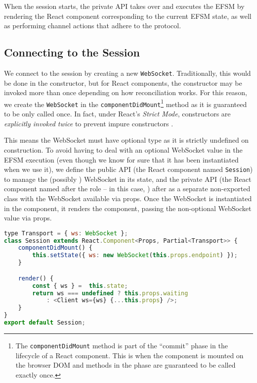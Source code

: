 When the session starts, the private API takes over and executes
the EFSM by rendering the React component corresponding to the
current EFSM state, as well as performing channel actions
that adhere to the protocol.

\subsection{Connecting to the Session}
We connect to the session by creating a new \texttt{WebSocket}.
Traditionally, this would be done in the constructor,
but for React components, the constructor may be invoked more
than once depending on how reconciliation works.
For this reason, we create the \texttt{WebSocket} in the
\texttt{componentDidMount}\footnote{
The \texttt{componentDidMount} method is part
of the ``commit'' phase in the lifecycle of a React component.
This is when the component is mounted on the browser DOM and
methods in the phase are guaranteed to be called exactly once.
} method as it is guaranteed
to be only called once.
In fact, under React's \textit{Strict Mode},
constructors are \textit{explicitly invoked twice} to 
prevent impure constructors \cite{ReactStrictMode}. 

This means the WebSocket must have optional type as it is 
strictly undefined on construction.
To avoid having to deal with an optional WebSocket value
in the EFSM execution (even though we know for sure that it
has been instantiated when we use it),
we define the public API (the React component named 
\texttt{Session}) to manage the (possibly )
WebSocket in its state, and the private API (the React component
named after the role -- in this case, ) after
as a separate non-exported class
with the WebSocket available via props. 
Once the WebSocket
is instantiated in the  component,
it renders the
 component, 
passing the non-optional WebSocket value via props.

\begin{lstlisting}[language=javascript,tabsize=2]
type Transport = { ws: WebSocket };
class Session extends React.Component<Props, Partial<Transport>> {
	componentDidMount() {
		this.setState({ ws: new WebSocket(this.props.endpoint) });
	}

	render() {
		const { ws } = 	this.state;
		return ws === undefined ? this.props.waiting 
			: <Client ws={ws} {...this.props} />;
	}
}	
export default Session;
\end{lstlisting}

